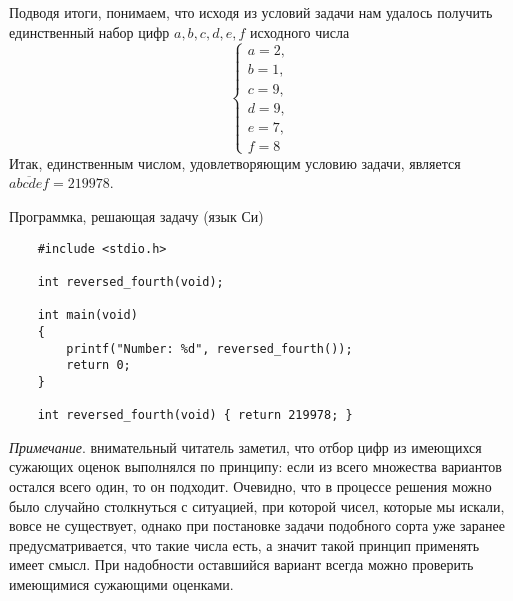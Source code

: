 \documentclass[12pt]{article}
\begin{document}
    Подводя итоги, понимаем, что исходя из условий задачи нам удалось получить единственный набор цифр $a, b, c, d, e, f$ исходного числа
    $$
        \begin{cases}
            a = 2, \\
            b = 1, \\
            c = 9, \\
            d = 9, \\
            e = 7, \\
            f = 8  
        \end{cases}
    $$
    Итак, единственным числом, удовлетворяющим условию задачи, является $\overline{abcdef} = 219978$.

    Программка, решающая задачу (язык Си) 

    \begin{verbatim}
    #include <stdio.h>

    int reversed_fourth(void);

    int main(void)
    {
        printf("Number: %d", reversed_fourth());
        return 0;
    }

    int reversed_fourth(void) { return 219978; }
    \end{verbatim}

    \textit{Примечание}. внимательный читатель заметил, что отбор цифр из имеющихся сужающих оценок выполнялся по принципу: если из всего множества вариантов остался всего один, то он подходит. Очевидно, что в процессе решения можно было случайно столкнуться с ситуацией, при которой чисел, которые мы искали, вовсе не существует, однако при постановке задачи подобного сорта уже заранее предусматривается, что такие числа есть, а значит такой принцип применять имеет смысл. При надобности оставшийся вариант всегда можно проверить имеющимися сужающими оценками.
\end{document}
